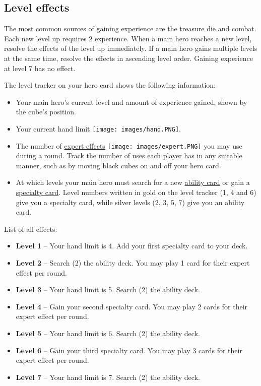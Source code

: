 \documentclass[12pt]{article}
\begin{document}
\subsection*{\hypertarget{Level}{Level effects}}
The most common sources of gaining experience are the treasure die and \hyperlink{Combatexperience}{combat}. Each new level up requires 2 experience. When a main hero reaches a new level, resolve the effects of the level up immediately. If a main hero gains multiple levels at the same time, resolve the effects in ascending level order. Gaining experience at level 7 has no effect.\par
The level tracker on your hero card shows the following information:
\begin{itemize}
\item Your main hero’s current level and amount of experience gained, shown by the cube's position.
\item Your current hand limit \texttt{[image: images/hand.PNG]}.
\item The number of \hyperlink{Ability}{expert effects} \texttt{[image: images/expert.PNG]} you may use during a round. Track the number of uses each player has in any suitable manner, such as by moving black cubes on and off your hero card.
\item At which levels your main hero must search for a new \hyperlink{Ability}{ability card} or gain a \hyperlink{Specialty}{specialty card}. Level numbers written in gold on the level tracker (1, 4 and 6) give you a specialty card, while silver levels (2, 3, 5, 7) give you an ability card.
\end{itemize}
List of all effects:
\begin{itemize}
\item \textbf{Level 1} – Your hand limit is 4. Add your first specialty card to your deck.
\item \textbf{Level 2} – Search (2) the ability deck. You may play 1 card for their expert effect per round.
\item \textbf{Level 3} – Your hand limit is 5. Search (2) the ability deck.
\item \textbf{Level 4} – Gain your second specialty card. You may play 2 cards for their expert effect per round.
\item \textbf{Level 5} – Your hand limit is 6. Search (2) the ability deck.
\item \textbf{Level 6} – Gain your third specialty card. You may play 3 cards for their expert effect per round.
\item \textbf{Level 7} – Your hand limit is 7. Search (2) the ability deck.
\end{itemize}
\end{document}

